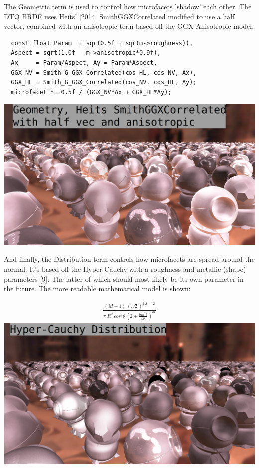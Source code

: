 \message{ !name(test.tex)}\documentclass{article}
\begin{document}
  The Geometric term is used to control how microfacets 'shadow' each other. The DTQ BRDF uses Heits' [2014] SmithGGXCorrelated modified to use a half vector, combined with an anisotropic term based off the GGX Anisotropic model:
  \begin{lstlisting}
  const float Param  = sqr(0.5f + sqr(m->roughness)),
  Aspect = sqrt(1.0f - m->anisotropic*0.9f),
  Ax     = Param/Aspect, Ay = Param*Aspect,
  GGX_NV = Smith_G_GGX_Correlated(cos_HL, cos_NV, Ax),
  GGX_HL = Smith_G_GGX_Correlated(cos_NV, cos_HL, Ay);
  microfacet *= 0.5f / (GGX_NV*Ax + GGX_HL*Ay);
  \end{lstlisting}
  \includegraphics[scale=0.20]{geometric}
  
  And finally, the Distribution term controls how microfacets are spread around the normal. It's based off the Hyper Cauchy with a roughness and metallic (shape) parameters [9]. The latter of which should most likely be its own parameter in the future. The more readable mathematical model is shown:
  
  \begin{align}
  \frac{(M - 1)\:(\sqrt{2})^{2\:S\:-\:2}}
  	    {\pi\:R^{2}\:cos^{4}\theta\:(2 +
  	      \frac{tan^{2}\theta}{M^2})^M}
  \end{align}
  \includegraphics[scale=0.20]{distribution}
  
\end{document}
